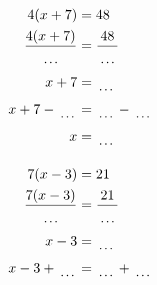 \documentclass[12pt]{article}
\newcounter{minipagecount}
\begin{document}
\begin{multicols}{2}
\begin{minipage}[t]{0.45\textwidth}
    \raggedright %
    \begin{align*} %
        4(x + 7) &= 48\\
        \frac{4(x+7)}{\dotuline{\hspace{5mm}}} &= \frac{48}{\dotuline{\hspace{5mm}}}\\
        x + 7 &= \dotuline{\hspace{5mm}}\\
        x + 7 - \dotuline{\hspace{5mm}} &= \dotuline{\hspace{5mm}} - \dotuline{\hspace{5mm}}\\
        x &= \dotuline{\hspace{5mm}}\\
    \end{align*}
\end{minipage} %
\noindent{(\theminipagecount)}\hspace{0.1mm} %
\begin{minipage}[t]{0.45\textwidth} %
    \vspace{-26pt}  %
    \raggedright %
    \begin{align*} %
        7(x - 3) &= 21\\
        \frac{7(x-3)}{\dotuline{\hspace{5mm}}} &= \frac{21}{\dotuline{\hspace{5mm}}}\\
        x - 3 &= \dotuline{\hspace{5mm}}\\
        x - 3 + \dotuline{\hspace{5mm}} &= \dotuline{\hspace{5mm}} + \dotuline{\hspace{5mm}}\\

\end{align*}
\end{minipage}
\end{multicols}
\end{document}
